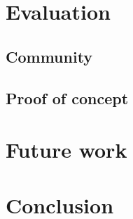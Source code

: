 \documentclass[a4paper]{artikel3}
\renewcommand{\paragraph}[1]{{\bf #1} }
\begin{document}
\section{Evaluation}

\subsection{Community} %
\label{sec:community}


\subsection{Proof of concept} %
\label{sec:poc}

\section{Future work} %
\label{sec:future_work}

\section{Conclusion} %
\label{sec:conclusion}



\end{document}

